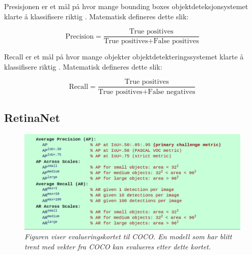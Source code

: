 Presisjonen er et mål på hvor mange bounding boxes objektdeteksjonsystemet klarte å klassifisere riktig \cite{Siddiqui m.fl. 207 s. 383}. Matematisk defineres dette slik:

\begin{equation}
\text{Precision} = \frac{\text{True positives}}{\text{True positives} + \text{False positives}}
\end{equation}


Recall er et mål på hvor mange objekter objektdetekteringssystemet klarte å klassifisere riktig \cite{Siddiqui m.fl. 207 s. 383}. Matematisk defineres dette slik:

\begin{equation}
\text{Recall} = \frac{\text{True positives}}{\text{True positives} + \text{False negatives}}
\end{equation}


\subsection{RetinaNet}

\begin{figure}[h!]
\begin{center} 
\includegraphics[scale=0.35]{figures/coco}
\caption{\small \sl Figuren viser evalueringskortet til COCO. En modell som har blitt trent med vekter fra COCO kan evalueres etter dette kortet. \label{fig:coco}}
\end{center}
\end{figure}

